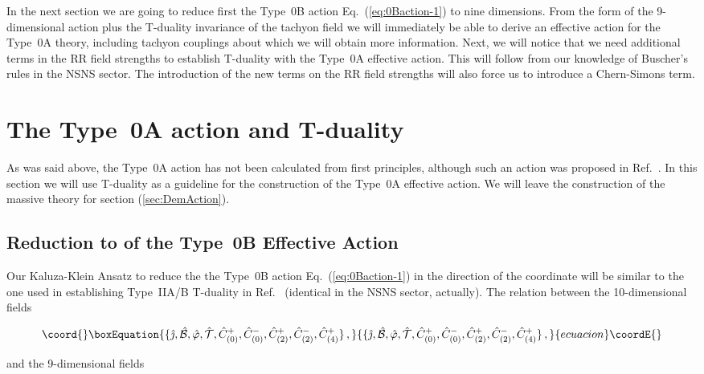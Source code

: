 \documentclass[12pt,a4paper]{article}
\begin{document}
In the next section we are going to reduce first the Type~0B
action Eq.~(\ref{eq:0Baction-1}) to nine dimensions. From the form of
the 9-dimensional action plus the T-duality invariance of the tachyon
field we will immediately be able to derive an effective action for
the Type~0A theory, including tachyon couplings about which we will
obtain more information. Next, we will notice that we need additional
terms in the RR field strengths to establish T-duality with the
Type~0A effective action. This will follow from our knowledge of
Buscher's rules in the NSNS sector.  The introduction of the new terms
on the RR field strengths will also force us to introduce a
Chern-Simons term.

\section{The Type~0A action and T-duality}
\label{sec:type0-9d}
As was said above, the Type~0A action has not been calculated from
first principles, although such an action was proposed in
Ref.~\cite{kn:FKM}. In this section we will use T-duality as a
guideline for the construction of the Type~0A effective action.  We
will leave the construction of the massive theory for section
(\ref{sec:DemAction}).
%
\subsection{Reduction to \coordHE{} of the Type~0B Effective Action}
%
Our Kaluza-Klein Ansatz to reduce the the Type~0B action
Eq.~(\ref{eq:0Baction-1}) in the direction of the coordinate \coordHE{}
will be similar to the one used in establishing Type~IIA/B T-duality
in Ref.~\cite{kn:MO} (identical in the NSNS sector, actually). The
relation between the 10-dimensional fields

\begin{equation}\coord{}\boxEquation{
\{\hat{\jmath},
\hat{\cal B},\hat{\varphi},\hat{\cal T}, 
\hat{C}^{+}_{(0)},\hat{C}^{-}_{(0)},\hat{C}^{+}_{(2)},
\hat{C}^{-}_{(2)},\hat{C}^{+}_{(4)}\}\, ,
}{
\{\hat{\jmath},
\hat{\cal B},\hat{\varphi},\hat{\cal T}, 
\hat{C}^{+}_{(0)},\hat{C}^{-}_{(0)},\hat{C}^{+}_{(2)},
\hat{C}^{-}_{(2)},\hat{C}^{+}_{(4)}\}\, ,
}{ecuacion}\coordE{}\end{equation}

\noindent and the 9-dimensional fields 
\end{document}
